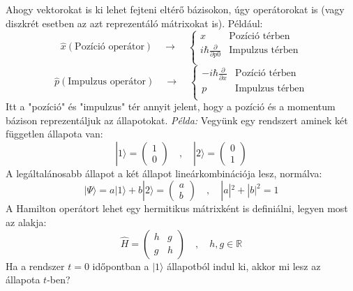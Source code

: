 \documentclass[../main.tex]{subfiles}
\begin{document}
Ahogy vektorokat is ki lehet fejteni eltérő bázisokon, úgy operátorokat is (vagy diszkrét esetben az azt reprezentáló mátrixokat is). Például:
\begin{equation}
    \hat{x} (\text{Pozíció operátor}) \quad \rightarrow \quad 
    \begin{cases}
        x & \text{Pozíció térben} \\
        i\hbar \frac{\partial}{\partial p0} & \text{Impulzus térben} \\
    \end{cases}
\end{equation}
\begin{equation}
    \hat{p} (\text{Impulzus operátor}) \quad \rightarrow \quad 
    \begin{cases}
        -i\hbar \frac{\partial}{\partial x} & \text{Pozíció térben} \\
        p & \text{Impulzus térben} \\
    \end{cases}
\end{equation}
Itt a "pozíció" és "impulzus" tér annyit jelent, hogy a pozíció és a momentum bázison reprezentáljuk az állapotokat.
\newline
\newline
\textit{Példa:}
\newline
\newline
Vegyünk egy rendszert aminek két független állapota van:
\begin{equation}
    |1\rangle = 
    \begin{pmatrix}
        1 \\
        0
    \end{pmatrix}
    \quad , \quad
    |2\rangle = 
    \begin{pmatrix}
        0 \\
        1
    \end{pmatrix}
\end{equation}
A legáltalánosabb állapot a két állapot lineárkombinációja lesz, normálva:
\begin{equation}
    |\Psi \rangle = a |1\rangle +  b |2\rangle = 
    \begin{pmatrix}
        a \\
        b
    \end{pmatrix}
    \quad , \quad |a|^2 + |b|^2 = 1
\end{equation}
A Hamilton operátort lehet egy hermitikus mátrixként is definiálni, legyen most az alakja:
\begin{equation}
    \hat{H} =
    \begin{pmatrix}
        h & g \\
        g & h
    \end{pmatrix}
    \quad , \quad h, g \in \mathbb{R}
\end{equation}
Ha a rendszer $t = 0$ időpontban a $|1\rangle$ állapotból indul ki, akkor mi lesz az állapota $t$-ben?
\end{document}
